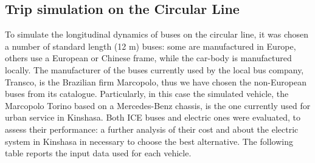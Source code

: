 \documentclass{article}
\begin{document}
\subsection{Trip simulation on the Circular Line}
To simulate the longitudinal dynamics of buses on the circular line, it was chosen a number of standard length (12 m) buses: some are manufactured in Europe, others use a European or Chinese frame, while the car-body is manufactured locally. The manufacturer of the buses currently used by the local bus company, Transco, is the Brazilian firm Marcopolo\cite{6}, thus we have chosen the non-European buses from its catalogue. Particularly, in this case the simulated vehicle, the Marcopolo Torino based on a Mercedes-Benz chassis, is the one currently used for urban service in Kinshasa. Both ICE buses and electric ones were evaluated, to assess their performance: a further analysis of their cost and about the electric system in Kinshasa in necessary to choose the best alternative. The following table reports the input data used for each vehicle.\\
\end{document}
